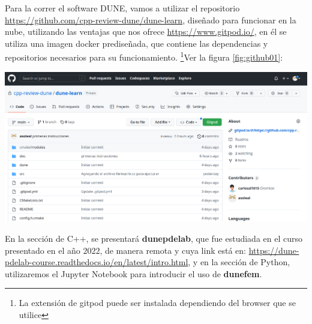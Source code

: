 Para la correr el software DUNE, vamos a utilizar el repositorio \url{https://github.com/cpp-review-dune/dune-learn},
diseñado para funcionar en la nube, utilizando las ventajas que nos ofrece \url{https://www.gitpod.io/}, en él 
se utiliza una imagen docker prediseñada, que contiene las dependencias y repositorios necesarios para su funcionamiento.
\footnote{La extensión de gitpod puede ser instalada dependiendo del browser
que se utilice}Ver la figura \ref{fig:github01}:
\begin{center}\label{fig:github01}
    \includegraphics*[scale=0.3]{cppreview-learn.png}
\end{center}

En la sección de C++, se presentará \textbf{dunepdelab}, que fue estudiada en el curso presentado en el año 
$2022$, de manera remota y cuya link está en: \url{https://dune-pdelab-course.readthedocs.io/en/latest/intro.html},
y en la sección de Python, utilizaremos el Jupyter Notebook para introducir el uso de \textbf{dunefem}.